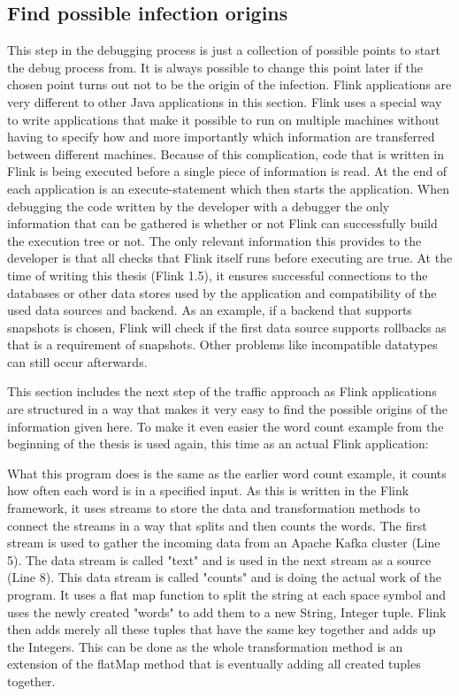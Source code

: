 \subsection{Find possible infection origins}
This step in the debugging process is just a collection of possible points to start the debug process from. It is always possible to change this point later if the chosen point turns out not to be the origin of the infection. Flink applications are very different to other Java applications in this section. Flink uses a special way to write applications that make it possible to run on multiple machines without having to specify how and more importantly which information are transferred between different machines. Because of this complication, code that is written in Flink is being executed before a single piece of information is read. At the end of each application is an execute-statement which then starts the application. When debugging the code written by the developer with a debugger the only information that can be gathered is whether or not Flink can successfully build the execution tree or not. The only relevant information this provides to the developer is that all checks that Flink itself runs before executing are true. At the time of writing this thesis (Flink 1.5), it ensures successful connections to the databases or other data stores used by the application and compatibility of the used data sources and backend. As an example, if a backend that supports snapshots is chosen, Flink will check if the first data source supports rollbacks as that is a requirement of snapshots. Other problems like incompatible datatypes can still occur afterwards.

This section includes the next step of the traffic approach as Flink applications are structured in a way that makes it very easy to find the possible origins of the information given here. To make it even easier the word count example from the beginning of the thesis is used again, this time as an actual Flink application:



What this program does is the same as the earlier word count example, it counts how often each word is in a specified input. As this is written in the Flink framework, it uses streams to store the data and transformation methods to connect the streams in a way that splits and then counts the words. The first stream is used to gather the incoming data from an Apache Kafka cluster (Line 5). The data stream is called "text" and is used in the next stream as a source (Line 8). This data stream is called "counts" and is doing the actual work of the program. It uses a flat map function to split the string at each space symbol and uses the newly created "words" to add them to a new String, Integer tuple. Flink then adds merely all these tuples that have the same key together and adds up the Integers. This can be done as the whole transformation method is an extension of the flatMap method that is eventually adding all created tuples together.

